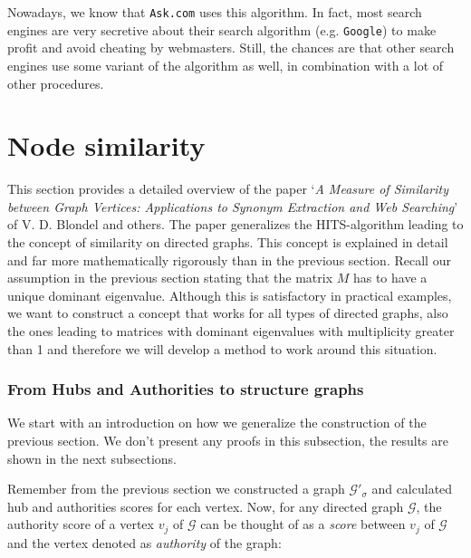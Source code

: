 \documentclass[a4paper,11pt]{report}
\newcommand{\graf}{\mathscr{G}}
\begin{document}
Nowadays, we know that \texttt{Ask.com} uses this algorithm. In fact, most search engines are 
very secretive about their search algorithm (e.g. \texttt{Google}) to make profit and avoid cheating by webmasters. Still, the chances 
are that other search engines use some variant of the algorithm as well, in 
combination with a lot of other procedures. 

\section{Node similarity}\label{sectionnodesim}
This section provides a detailed overview of the paper `\emph{A Measure of Similarity between Graph Vertices: 
Applications to Synonym Extraction and Web Searching}'\cite{blondel} of V. D. Blondel and others. 
The paper generalizes the HITS-algorithm leading to the concept of similarity on 
directed graphs. This concept is explained in detail and far more mathematically 
rigorously than in the previous section. Recall our assumption in the previous section stating that the matrix $M$ has to have a unique dominant
eigenvalue. Although this is satisfactory in practical examples, we want to 
construct a concept that works for all types of directed graphs, also the ones leading to 
matrices with dominant eigenvalues with multiplicity greater than 1 and therefore 
we will develop a method to work around this situation.  

\subsubsection{From Hubs and Authorities to structure graphs}
We start with an introduction on how we generalize the construction of the previous section. We don't present any proofs in this subsection,
the results are shown in the next subsections.

Remember from the previous section
we constructed a graph $\graf'_\sigma$ and calculated hub and authorities scores for each vertex.
Now, for any directed graph $\graf$, the authority score of a vertex $v_j$ of $\graf$ can be thought of as a \emph{score} between $v_j$ of $\graf$ 
and the vertex denoted as \emph{authority} of the graph:
\end{document}
